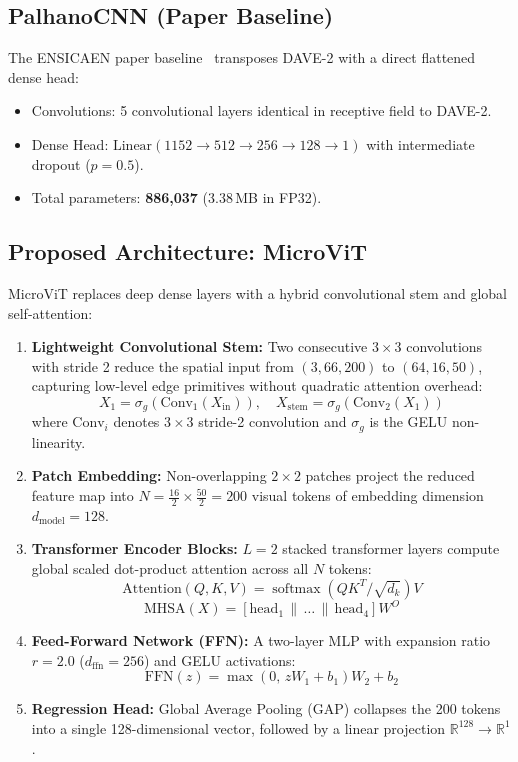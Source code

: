 \documentclass[10pt,journal,compsoc]{IEEEtran}
\begin{document}
\subsection{PalhanoCNN (Paper Baseline)}
The ENSICAEN paper baseline~\cite{palhano2026kart} transposes DAVE-2 with a direct flattened dense head:
\begin{itemize}
    \item Convolutions: 5 convolutional layers identical in receptive field to DAVE-2.
    \item Dense Head: $\text{Linear}(1152 \to 512 \to 256 \to 128 \to 1)$ with intermediate dropout ($p = 0.5$).
    \item Total parameters: \textbf{886,037} ($3.38$\,MB in FP32).
\end{itemize}

\subsection{Proposed Architecture: MicroViT}
MicroViT replaces deep dense layers with a hybrid convolutional stem and global self-attention:
\begin{enumerate}
    \item \textbf{Lightweight Convolutional Stem:} Two consecutive $3 \times 3$ convolutions with stride 2 reduce the spatial input from $(3, 66, 200)$ to $(64, 16, 50)$, capturing low-level edge primitives without quadratic attention overhead:
    \begin{equation}
    X_1 = \sigma_g(\text{Conv}_1(X_{\text{in}})), \quad X_{\text{stem}} = \sigma_g(\text{Conv}_2(X_1))
    \end{equation}
    where $\text{Conv}_i$ denotes $3 \times 3$ stride-2 convolution and $\sigma_g$ is the GELU non-linearity.
    \item \textbf{Patch Embedding:} Non-overlapping $2 \times 2$ patches project the reduced feature map into $N = \frac{16}{2} \times \frac{50}{2} = 200$ visual tokens of embedding dimension $d_{\text{model}} = 128$.
    \item \textbf{Transformer Encoder Blocks:} $L = 2$ stacked transformer layers compute global scaled dot-product attention across all $N$ tokens:
    \begin{equation}
    \text{Attention}(Q, K, V) = \operatorname{softmax}\left(QK^T / \sqrt{d_k}\right)V
    \end{equation}
    \begin{equation}
    \text{MHSA}(X) = [\text{head}_1 \,\|\, \dots \,\|\, \text{head}_4] W^O
    \end{equation}
    \item \textbf{Feed-Forward Network (FFN):} A two-layer MLP with expansion ratio $r = 2.0$ ($d_{\text{ffn}} = 256$) and GELU activations:
    \begin{equation}
    \text{FFN}(z) = \max(0, \, z W_1 + b_1)W_2 + b_2
    \end{equation}
    \item \textbf{Regression Head:} Global Average Pooling (GAP) collapses the 200 tokens into a single 128-dimensional vector, followed by a linear projection $\mathbb{R}^{128} \to \mathbb{R}^1$.
\end{enumerate}
\end{document}
